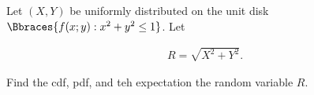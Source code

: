 
\begin{exercise}

Let $(X, Y)$ be uniformly distributed on the unit disk $\Bbraces{f(x; y): x^2 + y^2 \leq 1}$.
Let

\begin{align*}
    R = \sqrt{X^2 + Y^2}.
\end{align*}

Find the cdf, pdf, and teh expectation the random variable $R$.

\end{exercise}


\begin{solution}

\phantom{}

\end{solution}

